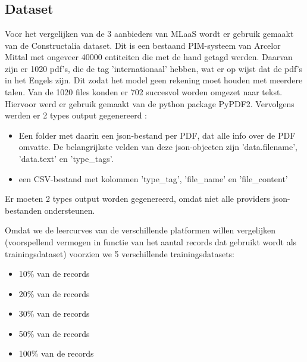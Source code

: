 
\chapter{}%
\label{ch:methodologie}


\section{Dataset}
Voor het vergelijken van de 3 aanbieders van MLaaS wordt er gebruik gemaakt van de Constructalia dataset. Dit is een bestaand PIM-systeem van Arcelor Mittal met ongeveer 40000 entiteiten die met de hand getagd werden. Daarvan zijn er 1020 pdf's, die de tag 'internationaal' hebben, wat er op wijst dat de pdf's in het Engels zijn. Dit zodat het model geen rekening moet  houden met meerdere talen. Van de 1020 files konden er 702 succesvol worden omgezet naar tekst. Hiervoor werd er gebruik gemaakt van de python package PyPDF2. Vervolgens werden er 2 types output gegenereerd :
\begin{itemize}
    \item Een folder met daarin een json-bestand per PDF, dat alle info over de PDF omvatte. De belangrijkste velden van deze json-objecten zijn 'data.filename', 'data.text' en 'type\_tags'.
    \item een CSV-bestand met kolommen 'type\_tag', 'file\_name' en 'file\_content' 
\end{itemize}

Er moeten 2 types output worden gegenereerd, omdat niet alle providers json-bestanden ondersteunen. 

Omdat we de leercurves van de verschillende platformen willen vergelijken (voorspellend vermogen in functie van het aantal records dat gebruikt wordt als trainingsdataset) voorzien we 5 verschillende trainingsdatasets: 
\begin{itemize}
    \item 10\% van de records
    \item 20\% van de records
    \item 30\% van de records
    \item 50\% van de records
    \item 100\% van de records
\end{itemize}

